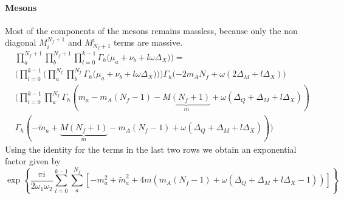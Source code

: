 \paragraph{Mesons}
Most of the components of the mesons remains massless, because only the non diagonal $M_{i}^{N_f+1}$ and $M_{N_f+1}^{i}$ terms are massive.
\begin{equation}
\begin{aligned}
& \prod_a^{N_f+1} \prod_b^{N_f+1}  \prod_{l=0}^{k-1}   \Gamma_h \big( \mu_a+  \nu_b + l \omega \Delta_X) \big)  = \\
& \bigg(  \prod_{l=0}^{k-1}  \bigg ( \prod_a^{N_f} \prod_b^{N_f} \Gamma_h \big( \mu_a + \nu_b + l \omega \Delta_X) \big)  \bigg)\Gamma_h( - 2 m_A N_f + \omega ( 2 \Delta_M +  l \Delta_X) \bigg)  \\
 &  \bigg(  \prod_{l=0}^{k-1} \prod_a^{N_f} \Gamma_h (m_a - m_A (N_f-1) - \underbrace{M(N_f+1)}_m  + \omega ( \Delta_Q + \Delta_M + l \Delta_X))\\
 & \Gamma_h(  - \tilde{m}_a + \underbrace{M (N_f +1)}_m - m_A ( N_f-1) + \omega ( \Delta_Q + \Delta_M + l \Delta_X) ) \bigg)
\end{aligned}
\end{equation}
Using the identity for the terms in the last two rows we obtain an exponential factor given by
\begin{equation}
\exp
\left\{ \frac{\pi i }{2 \omega_1 \omega_2}
\sum_{l=0}^{k-1} \sum_a^{N_f}
\left[ - m_a^2 + \tilde{m}_a^2 + 4  m \left( m_A (N_f - 1)  + \omega \left( \Delta_Q +  \Delta_M + l\Delta_X  -1\right)  \right)
\right]
\right\}
\label{eqn:contributo_mesoni}
\end{equation}

